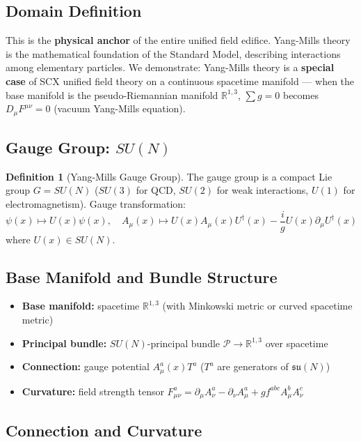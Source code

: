 \documentclass[12pt,a4paper]{article}
\theoremstyle{plain}
\theoremstyle{definition}
\newtheorem{definition}[theorem]{Definition}
\newcommand{\R}{\mathbb{R}}
\newcommand{\Pcal}{\mathcal{P}}
\begin{document}
\subsection{Domain Definition}

This is the \textbf{physical anchor} of the entire unified field edifice. Yang-Mills theory is the mathematical foundation of the Standard Model, describing interactions among elementary particles. We demonstrate: Yang-Mills theory is a \textbf{special case} of SCX unified field theory on a continuous spacetime manifold — when the base manifold is the pseudo-Riemannian manifold $\R^{1,3}$, $\sum g = 0$ becomes $D_\mu F^{\mu\nu} = 0$ (vacuum Yang-Mills equation).

\subsection{Gauge Group: $SU(N)$}

\begin{definition}[Yang-Mills Gauge Group]
The gauge group is a compact Lie group $G = SU(N)$ ($SU(3)$ for QCD, $SU(2)$ for weak interactions,
$U(1)$ for electromagnetism). Gauge transformation:
\begin{equation}
    \psi(x) \mapsto U(x) \psi(x), \quad A_\mu(x) \mapsto U(x) A_\mu(x) U^\dagger(x) - \frac{i}{g} U(x) \partial_\mu U^\dagger(x)
\end{equation}
where $U(x) \in SU(N)$.
\end{definition}

\subsection{Base Manifold and Bundle Structure}

\begin{itemize}
    \item \textbf{Base manifold:} spacetime $\R^{1,3}$ (with Minkowski metric or curved spacetime metric)
    \item \textbf{Principal bundle:} $SU(N)$-principal bundle $\Pcal \to \R^{1,3}$ over spacetime
    \item \textbf{Connection:} gauge potential $A_\mu^a(x) T^a$ ($T^a$ are generators of $\mathfrak{su}(N)$)
    \item \textbf{Curvature:} field strength tensor $F_{\mu\nu}^a = \partial_\mu A_\nu^a - \partial_\nu A_\mu^a + g f^{abc} A_\mu^b A_\nu^c$
\end{itemize}

\subsection{Connection and Curvature}
\end{document}

